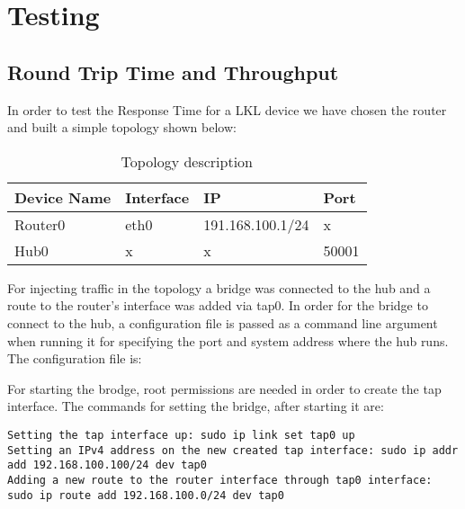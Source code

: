 \chapter{Testing}
\label{ch-testing}

\section{Round Trip Time and Throughput}
\label{sec:rt-troughput}

In order to test the Response Time for a LKL device we have chosen the router and built a simple topology shown below:
\begin{center}
  \begin{table}[htb]
  \begin{center}
  \begin{tabular}{| l | l | l | l |}
    \hline
      Device Name & Interface & IP & Port \\ \hline
      Router0 & eth0 & 191.168.100.1/24 & x \\ \hline
      Hub0 & x & x & 50001\\ \hline
    \hline
  \end{tabular}
  \end{center}
  \caption{Topology description}
  \label{table:resp-time}
  \end{table}
\end{center}


For injecting traffic in the topology a bridge was connected to the hub and a route to the router's interface was added via tap0. In order for the bridge to connect to the hub, a configuration file is passed as a command line argument when running it for specifying the port and system address where the hub runs.
The  configuration file is: 
\lstset{language=TeX, caption=Bridge configuration file}

For starting the brodge, root permissions are needed in order to create the tap interface.
The commands for setting the bridge, after starting it are:
\lstset{language=TeX,caption=Commands for configuring the bridge,label=test-bridge-config}
\begin{lstlisting}
Setting the tap interface up: sudo ip link set tap0 up
Setting an IPv4 address on the new created tap interface: sudo ip addr add 192.168.100.100/24 dev tap0
Adding a new route to the router interface through tap0 interface: sudo ip route add 192.168.100.0/24 dev tap0
\end{lstlisting}

